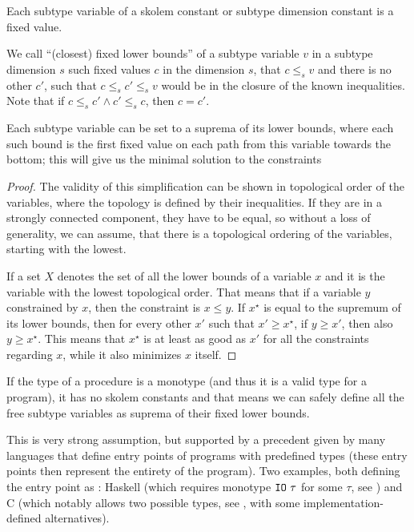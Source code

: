 \begin{defn}
    Each subtype variable of a skolem constant or subtype dimension constant is a fixed value.
\end{defn}

\begin{defn}
    We call ``(closest) fixed lower bounds'' of a subtype variable $v$ in a subtype dimension $s$ such fixed values $c$ in the dimension $s$, that $c \leq_s v$ and there is no other $c'$, such that $c \leq_s c' \leq_s v$ would be in the closure of the known inequalities. Note that if $c \leq_s c' \land c' \leq_s c$, then $c = c'$.
\end{defn}

\begin{lemma}Each subtype variable can be set to a suprema of its lower bounds, where each such bound is the first fixed value on each path from this variable towards the bottom; this will give us the minimal solution to the constraints
    \label{suprema_subtyping}

    \begin{proof}
        The validity of this simplification can be shown in topological order of the variables, where the topology is defined by their inequalities. If they are in a strongly connected component, they have to be equal, so without a loss of generality, we can assume, that there is a topological ordering of the variables, starting with the lowest.

        If a set $X$ denotes the set of all the lower bounds of a variable $x$ and it is the variable with the lowest topological order. That means that if a variable $y$ constrained by $x$, then the constraint is $x \leq y$. If $x^\star$ is equal to the supremum of its lower bounds, then for every other $x'$ such that $x' \geq x^\star$, if $y \geq x'$, then also $y \geq x^\star$. This means that $x^\star$ is at least as good as $x'$ for all the constraints regarding $x$, while it also minimizes $x$ itself.
    \end{proof}
\end{lemma}

\begin{cor}
    If the type of a procedure is a monotype (and thus it is a valid type for a program), it has no skolem constants and that means we can safely define all the free subtype variables as suprema of their fixed lower bounds.

    This is very strong assumption, but supported by a precedent given by many languages that define entry points of programs with predefined types (these entry points then represent the entirety of the program). Two examples, both defining the entry point as : Haskell (which requires monotype $\mathtt{IO}\ \tau$ for some $\tau$, see \cite{haskell2010}) and C (which notably allows two possible types, see \cite{cstandard2018}, with some implementation-defined alternatives).
\end{cor}


